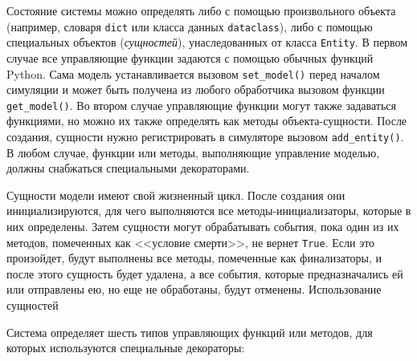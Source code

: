 Состояние системы можно определять либо с помощью произвольного объекта (например, словаря \texttt{dict} или класса данных \texttt{dataclass}), либо с помощью специальных объектов (\textit{сущностей}), унаследованных от класса \texttt{Entity}. В первом случае все управляющие функции задаются с помощью обычных функций Python. Сама модель устанавливается вызовом \texttt{set\_model()} перед началом симуляции и может быть получена из любого обработчика вызовом функции \texttt{get\_model()}. Во втором случае управляющие функции могут также задаваться функциями, но можно их также определять как методы объекта-сущности. После создания, сущности нужно регистрировать в симуляторе вызовом \texttt{add\_entity()}. В любом случае, функции или методы, выполняющие управление моделью, должны снабжаться специальными декораторами.

Сущности модели имеют свой жизненный цикл. После создания они инициализируются, для чего выполняются все методы-инициализаторы, которые в них определены. Затем сущности могут обрабатывать события, пока один из их методов, помеченных как <<условие смерти>>, не вернет \texttt{True}. Если это произойдет, будут выполнены все методы, помеченные как финализаторы, и после этого сущность будет удалена, а все события, которые предназначались ей или отправлены ею, но еще не обработаны, будут отменены. Использование сущностей

Система определяет шесть типов управляющих функций или методов, для которых используются специальные декораторы:

